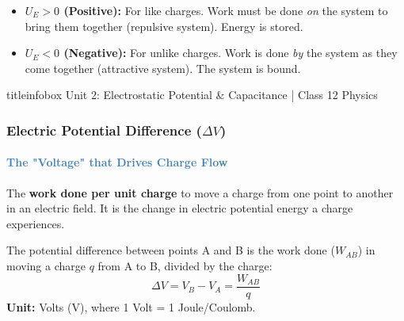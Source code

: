 \begin{frame}
\begin{frame}
\vspace{0.35cm}

\begin{importantbox}
\vspace{0.1cm}
\begin{itemize}
    \item \textbf{$U_E > 0$ (Positive):} For like charges. Work must be done \textit{on} the system to bring them together (repulsive system). Energy is stored.
    \item \textbf{$U_E < 0$ (Negative):} For unlike charges. Work is done \textit{by} the system as they come together (attractive system). The system is bound.
\end{itemize}
\vspace{0.1cm}
\end{importantbox}

\vfill

\begin{beamercolorbox}[wd=\textwidth,ht=0.5cm,dp=0.1cm,center]{titleinfobox}
    \small\color{coolgray} Unit 2: Electrostatic Potential & Capacitance | Class 12 Physics
\end{beamercolorbox}
\end{frame}

\begin{frame}
\frametitle{\textsf{\textbf{Electric Potential Difference ($\Delta V$)}}}
\framesubtitle{\textcolor{steelblue}{The "Voltage" that Drives Charge Flow}}

\vspace{-0.05cm}

\begin{keybox}
\vspace{0.1cm}
The \textbf{work done per unit charge} to move a charge from one point to another in an electric field. It is the change in electric potential energy a charge experiences.
\vspace{0.1cm}
\end{keybox}

\vspace{0.35cm}

\begin{formulabox}
\vspace{0.1cm}
The potential difference between points A and B is the work done ($W_{AB}$) in moving a charge $q$ from A to B, divided by the charge:
\begin{equation*}
\boxed{\Delta V = V_B - V_A = \frac{W_{AB}}{q}}
\end{equation*}
\textbf{Unit:} Volts (V), where 1 Volt = 1 Joule/Coulomb.
\vspace{0.1cm}
\end{formulabox}


\end{frame}
\end{frame}
